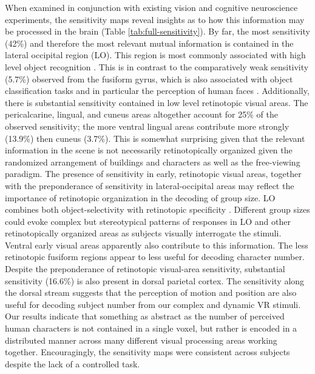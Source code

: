 \documentclass[preprint,5p,authoryear]{elsarticle}
\begin{document}
When examined in conjunction with existing vision and cognitive neuroscience experiments, the sensitivity maps reveal insights as to how this information may be processed in the brain (Table \ref{tab:full-sensitivity}).
By far, the most sensitivity (42\%) and therefore the most relevant mutual information is contained in the lateral occipital region (LO).
This region is most commonly associated with high level object recognition \citep{Grill-Spector2001}.
This is in contrast to the comparatively weak sensitivity (5.7\%) observed from the fusiform gyrus, which is also associated with object classification tasks and in particular the perception of human faces \citep{Kanwisher1997}.
Additionally, there is substantial sensitivity contained in low level retinotopic visual areas. 
The pericalcarine, lingual, and cuneus areas altogether account for 25\% of the observed sensitivity; the more ventral lingual areas contribute more strongly (13.9\%) then cuneus (3.7\%).
This is somewhat surprising given that the relevant information in the scene is not necessarily retinotopically organized given the randomized arrangement of buildings and characters as well as the free-viewing paradigm.
The presence of sensitivity in early, retinotopic visual areas, together with the preponderance of sensitivity in lateral-occipital areas may reflect the importance of retinotopic organization in the decoding of group size. 
LO combines both object-selectivity with retinotopic specificity \citep{Sayres2008}. 
Different group sizes could evoke complex but stereotypical patterns of responses in LO and other retinotopically organized areas as subjects visually interrogate the stimuli. 
Ventral early visual areas apparently also contribute to this information. 
The less retinotopic fusiform regions \citep{Schwarzlose2008,Sayres2010} appear to less useful for decoding character number.
Despite the preponderance of retinotopic visual-area sensitivity, substantial sensitivity (16.6\%) is also present in dorsal parietal cortex. 
The sensitivity along the dorsal stream suggests that the perception of motion and position are also useful for decoding subject number from our complex and dynamic VR stimuli.
Our results indicate that something as abstract as the number of perceived human characters is not contained in a single voxel, but rather is encoded in a distributed manner across many different visual processing areas working together.
Encouragingly, the sensitivity maps were consistent across subjects despite the lack of a controlled task.
\end{document}
